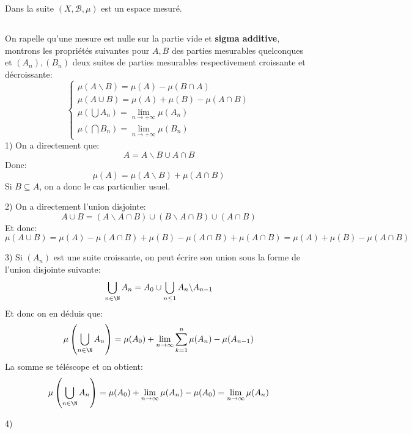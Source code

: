 \documentclass{report}
\begin{document}
   Dans la suite \((X, \mathscr{B}, \mu)\) est un espace mesuré.
   \subsection*{}
   On rapelle qu'une mesure est nulle sur la partie vide et \textbf{sigma additive}, montrons les propriétés suivantes pour \( A, B \) des parties mesurables quelconques et \( (A_n), (B_n) \) deux suites de parties mesurables respectivement croissante et décroissante:
   \[ 
      \begin{cases}
         \mu(A \backslash B) = \mu(A) - \mu(B \cap A)\\
         \mu(A \cup B) = \mu(A) + \mu(B) - \mu(A \cap B)\\
         \mu(\bigcup A_n) = \lim_{n \rightarrow +\infty} \mu(A_n)\\
         \mu(\bigcap B_n) = \lim_{n \rightarrow + \infty} \mu(B_n)
      \end{cases} 
   \]
   1) On a directement que:
   \[ 
      A = A \backslash B \cup A \cap B 
   \]
   Donc:
   \[ 
      \mu(A) = \mu(A \backslash B) + \mu(A \cap B) 
   \]
   Si \( B \subseteq A \), on a donc le cas particulier usuel.\<

   2) On a directement l'union disjointe:
   \[ 
      A  \cup B = (A \backslash A \cap B) \cup (B \backslash A \cap B) \cup (A \cap B)  
   \]
   Et donc:
   \[ 
      \mu(A \cup B) = \mu(A) - \mu(A \cap B) + \mu(B) - \mu(A \cap B) + \mu(A \cap B) = \mu(A) + \mu(B) - \mu(A \cap B)
   \]\<

   3) Si \( (A_n) \) est une suite croissante, on peut écrire son union sous la forme de l'union disjointe suivante:
   \[ 
      \bigcup_{n \in \N} A_n = A_0 \cup \bigcup_{n \leq 1} A_n \backslash A_{n-1}
   \]
   Et donc on en déduis que:
   \[ 
      \mu\left(\bigcup_{n \in \N} A_n\right) = \mu(A_0) + \lim_{n \rightarrow \infty} \sum_{k=1}^n \mu(A_n) - \mu(A_{n-1}) 
   \]
   La somme se téléscope et on obtient:
   \[ 
      \mu\left(\bigcup_{n \in \N} A_n\right) = \mu(A_0) + \lim_{n \rightarrow \infty} \mu(A_n) - \mu(A_0) = \lim_{n \rightarrow \infty} \mu(A_n) 
   \]

   4) 
   
   \subsection*{}
   \subsection*{}
\end{document}
